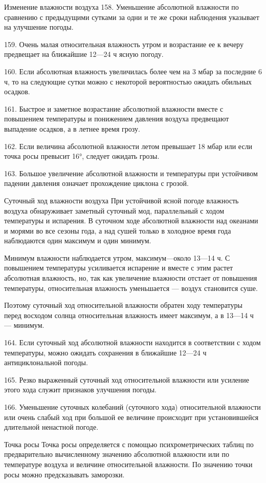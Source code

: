 Изменение влажности воздуха
158. Уменьшение абсолютной влажности по сравнению с предыдущими сутками за одни и те же сроки наблюдения указывает на улучшение погоды.

159. Очень малая относительная влажность утром и возрастание ее к вечеру предвещает на ближайшие 12—24 ч ясную погоду.

160. Если абсолютная влажность увеличилась более чем на 3 мбар за последние 6 ч, то на следующие сутки можно с некоторой вероятностью ожидать обильных осадков.

161. Быстрое и заметное возрастание абсолютной влажности вместе с повышением температуры и понижением давления воздуха предвещают выпадение осадков, а в летнее время грозу.

162. Если величина абсолютной влажности летом превышает 18 мбар или если точка росы превысит 16°, следует ожидать грозы.

163. Большое увеличение абсолютной влажности и температуры при устойчивом падении давления означает прохождение циклона с грозой.

Суточный ход влажности воздуха
При устойчивой ясной погоде влажность воздуха обнаруживает заметный суточный мод, параллельный с ходом температуры и испарения. В суточном ходе абсолютной влажности над океанами и морями во все сезоны года, а над сушей только в холодное время года наблюдаются один максимум и один минимум.

Минимум влажности наблюдается утром, максимум—около 13—14 ч. С повышением температуры усиливается испарение и вместе с этим растет абсолютная влажность, но, так как увеличение влажности отстает от повышения температуры, относительная влажность уменьшается --- воздух становится суше.

Поэтому суточный ход относительной влажности обратен ходу температуры перед восходом солнца относительная влажность имеет максимум, а в 13—14 ч — минимум.

164. Если суточный ход абсолютной влажности находится в соответствии с ходом температуры, можно ожидать сохранения в ближайшие 12—24 ч антициклональной погоды.

165. Резко выраженный суточный ход относительной влажности или усиление этого хода служит признаков улучшения погоды.

166. Уменьшение суточных колебаний (суточного хода) относительной влажности или очень слабый ход при большой ее величине происходит при установившейся длительной ненастной погоде.

Точка росы
Точка росы определяется с помощью психрометрических таблиц по предварительно вычисленному значению абсолютной влажности или по температуре воздуха и величине относительной влажности. По значению точки росы можно предсказывать заморозки.

